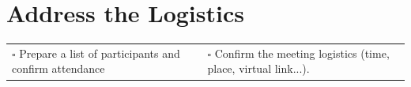 
\section{Address the Logistics}
\label{sec:premeeting}

\begin{tabular}{p{9cm} p{8cm}}
$\square$ Prepare a list of participants and confirm attendance & $\square$ Confirm the meeting logistics (time, place, virtual link...). \\ 
\end{tabular}

